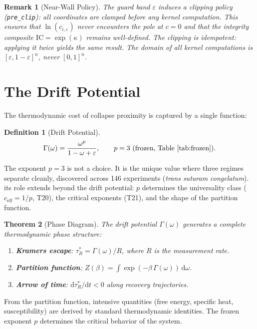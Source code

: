\documentclass[
  aps,
  prd,
  preprint,
  superscriptaddress,
  nofootinbib,
  floatfix,
  longbibliography
]{revtex4-2}
\newtheorem{theorem}{Theorem}
\newtheorem{definition}[theorem]{Definition}
\newtheorem{remark}{Remark}
\newcommand{\tRstar}{\tau_{\!R}^{*}}
\newcommand{\Gam}{\Gamma}
\newcommand{\eps}{\varepsilon}
\newcommand{\dd}{\mathrm{d}}
\newcommand{\beq}{\begin{equation}}
\newcommand{\eeq}{\end{equation}}
\newcommand{\IC}{\mathrm{IC}}
\newcommand{\Drft}{\omega}
\newcommand{\Logint}{\kappa}
\newcommand{\ceff}{c_{\mathrm{eff}}}
\newcommand{\lat}[1]{\textit{#1}}
\begin{document}
\begin{remark}[Near-Wall Policy]
The guard band $\eps$ induces a clipping policy (\texttt{pre\_clip}):
all coordinates are clamped \emph{before} any kernel computation.
This ensures that $\ln(c_{i,\eps})$ never encounters the pole
at $c = 0$ and that the integrity composite $\IC = \exp(\Logint)$
remains well-defined. The clipping is idempotent: applying it twice
yields the same result. The domain of all kernel computations is
$[\eps, 1-\eps]^n$, never $[0,1]^n$.
\end{remark}

\section{The Drift Potential}\label{sec:drift}

The thermodynamic cost of collapse proximity is captured by
a single function:

\begin{definition}[Drift Potential]\label{def:Gamma}
\beq
  \Gam(\Drft) = \frac{\Drft^p}{1 - \Drft + \eps},
  \qquad p = 3 \text{ (frozen, Table~\ref{tab:frozen})}.
\eeq
\end{definition}

The exponent $p = 3$ is not a choice.
It is the unique value where three regimes separate cleanly,
discovered across 146 experiments
(\lat{trans suturam congelatum}).
its role extends beyond the drift potential: $p$ determines
the universality class ($\ceff = 1/p$, T20),
the critical exponents (T21), and the shape of the
partition function.

\begin{theorem}[Phase Diagram]\label{thm:phase}
The drift potential $\Gam(\Drft)$ generates a complete
thermodynamic phase structure:
\begin{enumerate}[nosep,leftmargin=*]
  \item \textbf{Kramers escape}:
    $\tRstar = \Gam(\Drft) / R$,
    where $R$ is the measurement rate.
  \item \textbf{Partition function}:
    $Z(\beta) = \int \exp(-\beta\,\Gam(\Drft))\,\dd\Drft$.
  \item \textbf{Arrow of time}:
    $\dd\tRstar/\dd t < 0$ along recovery trajectories.
\end{enumerate}
\end{theorem}

From the partition function, intensive quantities
(free energy, specific heat, susceptibility) are
derived by standard thermodynamic identities.
The frozen exponent $p$ determines the critical behavior
of the system.
\end{document}

